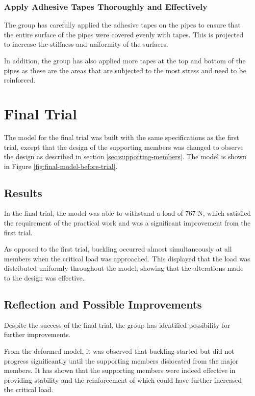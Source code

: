 \documentclass[fleqn,10pt]{SelfArx} %
\begin{document}
\subsubsection{Apply Adhesive Tapes Thoroughly and Effectively}

The group has carefully applied the adhesive tapes on the pipes to ensure that the
	entire surface of the pipes were covered evenly with tapes. This is projected to
	increase the stiffness and uniformity of the surfaces.

In addition, the group has also applied more tapes at the top and bottom of the pipes
	as these are the areas that are subjected to the most stress and need to be reinforced.
	
\section{Final Trial}

The model for the final trial was built with the same specifications as the first trial,
	except that the design of the supporting members was changed to observe the design as
	described in section \ref{sec:supporting-members}. The model is shown in Figure
	\ref{fig:final-model-before-trial}.

\subsection{Results}

In the final trial, the model was able to withstand a load of $767\text{ N}$, which satisfied
	the requirement of the practical work and was a significant improvement from the first
	trial.

As opposed to the first trial, buckling occurred almost simultaneously at all members when
	the critical load was approached. This displayed that the load was distributed uniformly
	throughout the model, showing that the alterations made to the design was effective.

\subsection{Reflection and Possible Improvements}

Despite the success of the final trial, the group has identified possibility for further
	improvements.

From the deformed model, it was observed that buckling started but did not progress
	significantly until the supporting members dislocated from the major members.
	It has shown that the supporting members were indeed effective in providing stability
	and the reinforcement of which could have further increased the critical load.
\end{document}
